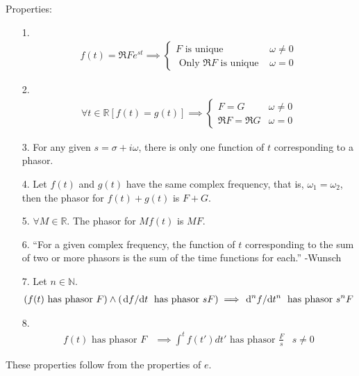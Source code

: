 \documentclass[12pt, english]{book}
\begin{document}
	Properties: 
	\begin{itemize}
		\item[1.] 
		\begin{align*}
			f(t) = \Re{Fe^{st}} \implies 
			\begin{cases}
				F \text{ is unique } & \omega \neq 0 \\
				\text{ Only } \Re{F} \text{ is unique } & \omega = 0
			\end{cases}
		\end{align*}
		\item[2.] 
		\begin{align*}
			\forall t\in \mathbb{R} [f(t) = g(t)] \implies 
			\begin{cases}
				F = G & \omega \neq 0 \\
				\Re{F} = \Re{G} & \omega = 0
			\end{cases}
		\end{align*}
		\item[3.] For any given \(s = \sigma + i \omega \), there is only one function of \(t\) corresponding to a phasor.
		\item[4.] Let \(f(t)\) and \(g(t)\) have the same complex frequency, that is, \(\omega_1 = \omega_2\), then the phasor for \(f(t) + g(t)\) is \(F + G\).
		\item[5.] \(\forall M \in \mathbb{R}\). The phasor for \(Mf(t)\) is \(MF\).
		\item[6.] ``For a given complex frequency, the function of \(t\) corresponding to the sum of two or more phasors is the sum of the time functions for each.'' -Wunsch
		\item[7.] Let \(n \in \mathbb{N}\).
		\begin{align*}
			(f(t) \text{ has phasor } F) \land (\dv*{f}{t} \text{ has phasor } sF) \implies \dv*[n]{f}{t} \text{ has phasor } s^n F
		\end{align*}
		\item[8.] 
		\begin{align*}
			f(t) \text{ has phasor } F &\implies \int^t f(t') dt'  \text{ has phasor } \frac{F}{s} & s\neq 0
		\end{align*}
	\end{itemize}
	These properties follow from the properties of \(e\).
	
\end{document}
